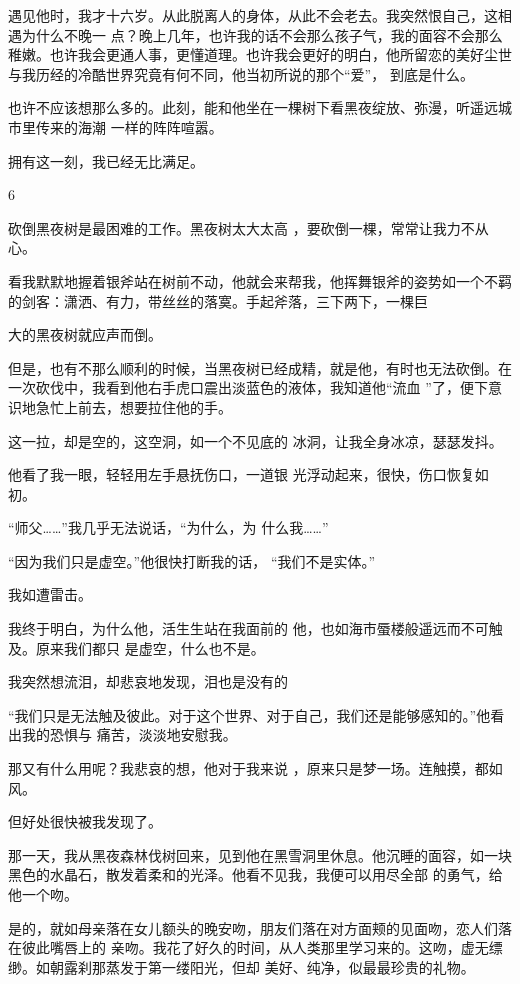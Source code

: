 \documentclass{article}
\begin{document}
遇见他时，我才十六岁。从此脱离人的身体，从此不会老去。我突然恨自己，这相遇为什么不晚一
\newpage
点？晚上几年，也许我的话不会那么孩子气，我的面容不会那么稚嫩。也许我会更通人事，更懂道理。也许我会更好的明白，他所留恋的美好尘世与我历经的冷酷世界究竟有何不同，他当初所说的那个“爱”，
到底是什么。 

也许不应该想那么多的。此刻，能和他坐在一棵树下看黑夜绽放、弥漫，听遥远城市里传来的海潮
一样的阵阵喧嚣。 


拥有这一刻，我已经无比满足。 


6 

砍倒黑夜树是最困难的工作。黑夜树太大太高
，要砍倒一棵，常常让我力不从心。 

看我默默地握着银斧站在树前不动，他就会来帮我，他挥舞银斧的姿势如一个不羁的剑客：潇洒、有力，带丝丝的落寞。手起斧落，三下两下，一棵巨

\newpage
大的黑夜树就应声而倒。 

但是，也有不那么顺利的时候，当黑夜树已经成精，就是他，有时也无法砍倒。在一次砍伐中，我看到他右手虎口震出淡蓝色的液体，我知道他“流血
”了，便下意识地急忙上前去，想要拉住他的手。 

这一拉，却是空的，这空洞，如一个不见底的
冰洞，让我全身冰凉，瑟瑟发抖。 

他看了我一眼，轻轻用左手悬抚伤口，一道银
光浮动起来，很快，伤口恢复如初。 

“师父……”我几乎无法说话，“为什么，为
什么我……” 

“因为我们只是虚空。”他很快打断我的话，
“我们不是实体。” 


我如遭雷击。 

我终于明白，为什么他，活生生站在我面前的
\newpage
他，也如海市蜃楼般遥远而不可触及。原来我们都只
是虚空，什么也不是。 

我突然想流泪，却悲哀地发现，泪也是没有的

“我们只是无法触及彼此。对于这个世界、对于自己，我们还是能够感知的。”他看出我的恐惧与
痛苦，淡淡地安慰我。 

那又有什么用呢？我悲哀的想，他对于我来说
，原来只是梦一场。连触摸，都如风。 


但好处很快被我发现了。 

那一天，我从黑夜森林伐树回来，见到他在黑雪洞里休息。他沉睡的面容，如一块黑色的水晶石，散发着柔和的光泽。他看不见我，我便可以用尽全部
的勇气，给他一个吻。 

是的，就如母亲落在女儿额头的晚安吻，朋友们落在对方面颊的见面吻，恋人们落在彼此嘴唇上的
\newpage
亲吻。我花了好久的时间，从人类那里学习来的。这吻，虚无缥缈。如朝露刹那蒸发于第一缕阳光，但却
美好、纯净，似最最珍贵的礼物。 
\end{document}
